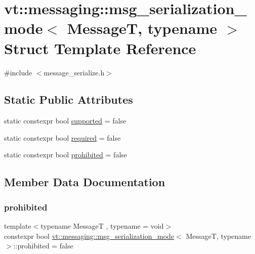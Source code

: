 \hypertarget{structvt_1_1messaging_1_1msg__serialization__mode}{}\section{vt\+:\+:messaging\+:\+:msg\+\_\+serialization\+\_\+mode$<$ MessageT, typename $>$ Struct Template Reference}
\label{structvt_1_1messaging_1_1msg__serialization__mode}


{\ttfamily \#include $<$message\+\_\+serialize.\+h$>$}

\subsection*{Static Public Attributes}
\begin{DoxyCompactItemize}
\item 
static constexpr bool \hyperlink{structvt_1_1messaging_1_1msg__serialization__mode_ab0dc8ca8b40b6e796c4d6b3ee63a69e1}{supported} = false
\item 
static constexpr bool \hyperlink{structvt_1_1messaging_1_1msg__serialization__mode_a8f8d90f9eb1935c504685abe11600a57}{required} = false
\item 
static constexpr bool \hyperlink{structvt_1_1messaging_1_1msg__serialization__mode_acbb32d6af6d5ba4be9ca43a202778b7a}{prohibited} = false
\end{DoxyCompactItemize}


\subsection{Member Data Documentation}
\mbox{\label{structvt_1_1messaging_1_1msg__serialization__mode_acbb32d6af6d5ba4be9ca43a202778b7a}} 
\subsubsection{\texorpdfstring{prohibited}{prohibited}}
{\footnotesize\ttfamily template$<$typename MessageT , typename  = void$>$ \\
constexpr bool \hyperlink{structvt_1_1messaging_1_1msg__serialization__mode}{vt\+::messaging\+::msg\+\_\+serialization\+\_\+mode}$<$ MessageT, typename $>$\+::prohibited = false\hspace{0.3cm}{\ttfamily [static]}}

